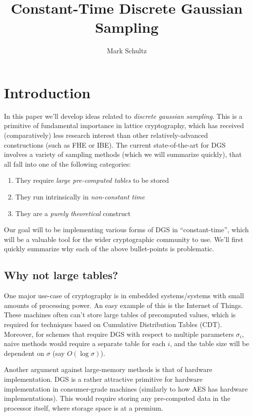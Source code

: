 \documentclass{article}
\begin{document}
\title{Constant-Time Discrete Gaussian Sampling}
\author{Mark Schultz}
\maketitle
\section{Introduction}
In this paper we'll develop ideas related to \emph{discrete gaussian sampling}.
This is a primitive of fundamental importance in lattice cryptography, which has received (comparatively) less research interest than other relatively-advanced constructions (such as FHE or IBE).
The current state-of-the-art for DGS involves a variety of sampling methods (which we will summarize quickly), that all fall into one of the following categories:
\begin{enumerate}
\item They require \emph{large pre-computed tables} to be stored
\item They run intrinsically in \emph{non-constant time}
\item They are a \emph{purely theoretical} construct
\end{enumerate}
Our goal will to be implementing various forms of DGS in ``constant-time'', which will be a valuable tool for the wider cryptographic community to use.
We'll first quickly summarize why each of the above bullet-points is problematic.
\subsection{Why not large tables?}
One major use-case of cryptography is in embedded systems/systems with small amounts of processing power.
An easy example of this is the Internet of Things.
These machines often can't store large tables of precomputed values, which is required for techniques based on Cumulative Distribution Tables (CDT).
Moreover, for schemes that require DGS with respect to multiple parameters $\sigma_i$, naive methods would require a separate table for each $i$, and the table size will be dependent on $\sigma$ (say $O(\log\sigma)$).

Another argument against large-memory methods is that of hardware implementation.
DGS is a rather attractive primitive for hardware implementation in consumer-grade machines (similarly to how AES has hardware implementations).
This would require storing any pre-computed data in the processor itself, where storage space is at a premium.
\end{document}
